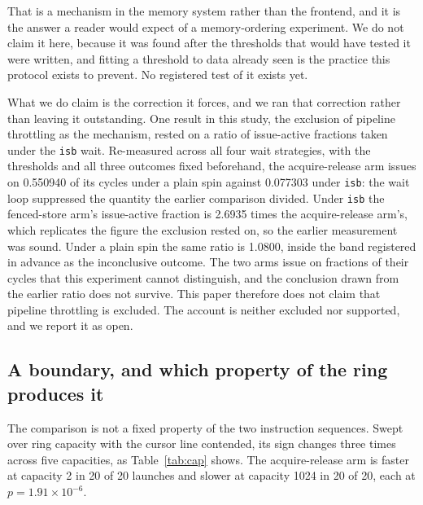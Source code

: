 \documentclass[conference]{IEEEtran}
\begin{document}
That is a mechanism in the memory system rather than the frontend, and it is the
answer a reader would expect of a memory-ordering experiment. We do not claim it
here, because it was found after the thresholds that would have tested it were
written, and fitting a threshold to data already seen is the practice this
protocol exists to prevent. No registered test of it exists yet.

What we do claim is the correction it forces, and we ran that correction rather
than leaving it outstanding. One result in this study, the exclusion of pipeline
throttling as the mechanism, rested on a ratio of issue-active fractions taken
under the \texttt{isb} wait. Re-measured across all four wait strategies, with
the thresholds and all three outcomes fixed beforehand, the acquire-release arm
issues on 0.550940 of its cycles under a plain spin against 0.077303 under
\texttt{isb}: the wait loop suppressed the quantity the earlier comparison
divided. Under \texttt{isb} the fenced-store arm's issue-active fraction is
2.6935 times the acquire-release arm's, which replicates the figure the
exclusion rested on, so the earlier measurement was sound. Under a plain spin
the same ratio is 1.0800, inside the band registered in advance as the
inconclusive outcome. The two arms issue on fractions of their cycles that this
experiment cannot distinguish, and the conclusion drawn from the earlier ratio
does not survive. This paper therefore does not claim that pipeline throttling
is excluded. The account is neither excluded nor supported, and we report it as
open.

\subsection{A boundary, and which property of the ring produces it}

The comparison is not a fixed property of the two instruction sequences. Swept
over ring capacity with the cursor line contended, its sign changes three times
across five capacities, as Table~\ref{tab:cap} shows. The acquire-release arm is
faster at capacity 2 in 20 of 20 launches and slower at capacity 1024 in 20 of
20, each at $p = 1.91\times10^{-6}$.
\end{document}
